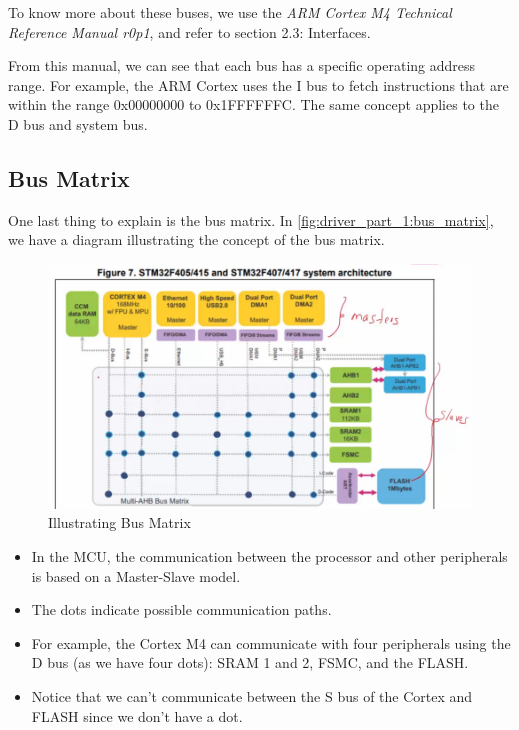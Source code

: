 To know more about these buses, we use the \textit{ARM Cortex M4 Technical Reference Manual r0p1}, and refer to section 2.3: Interfaces.

From this manual, we can see that each bus has a specific operating address range. For example, the ARM Cortex uses the I bus to fetch instructions that are within the range  0x00000000 to 0x1FFFFFFC. The same concept applies to the D bus and system bus.


\subsection{Bus Matrix}

One last thing to explain is the bus matrix. In \autoref{fig:driver_part_1:bus_matrix}, we have a diagram illustrating the concept of the bus matrix.

\begin{figure}[h]
\centering
\includegraphics[scale=0.7]{Figures/driver_part_1/bus_matrix}
\caption{Illustrating Bus Matrix}
\label{fig:driver_part_1:bus_matrix}
\end{figure} 

\begin{itemize}
    \item In the MCU, the communication between the processor and other peripherals is based on a Master-Slave model.

    \item The dots indicate possible communication paths.

    \item For example, the Cortex M4 can communicate with four peripherals using the D bus (as we have four dots): SRAM 1 and 2, FSMC, and the FLASH.

    \item Notice that we can't communicate between the S bus of the Cortex and FLASH since we don't have a dot.
    
\end{itemize}


